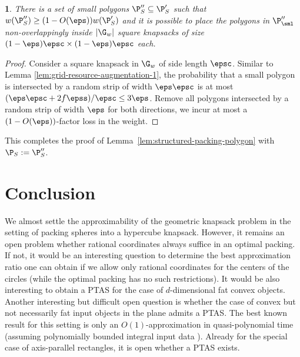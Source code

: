\documentclass[10pt,a4paper]{article}
\theoremstyle{plain}
\theoremstyle{plain}
\newtheorem{lem}[theorem]{\protect\lemmaname}
\theoremstyle{plain}
\theoremstyle{definition}
\providecommand{\lemmaname}{Lemma}
\newcommand{\agtwo}[1]{#1}
\begin{document}
{\begin{lem} \label{lem:grid-resource-augmentation}There is a set
	of small polygons $\P''_{S}\subseteq\P'_{S}$ such that $w(\P''_{S})\ge(1-O(\eps))w(\P'_{S})$
	and it is possible to place the polygons in $\P''_{\sml}$ non-overlappingly
	inside $|\G_{w}|$ square knapsacks of size $(1-\eps)\epsc \times(1-\eps)\epsc$
	each. \end{lem}
\begin{proof}
	Consider a square knapsack in $\G_{w}$ of side length $\epsc$.
        Similar to Lemma \ref{lem:grid-resource-augmentation-1}, the probability that a small polygon is intersected by a random strip of width $\eps \epsc$ is at most $(\eps\epsc+2f\epss)/\epsc \le 3\eps$.
	Remove all polygons intersected by a random strip of width $\eps$ for both directions, we incur at most a $(1-O(\eps))$-factor loss in the weight.
\end{proof}
This completes the proof of Lemma~\ref{lem:structured-packing-polygon} with $\P_{S}:= \P''_{S}$.



\section{Conclusion}
\label{sec:conc} 
We almost settle the approximability of the geometric knapsack problem in the setting of 
packing spheres into a hypercube knapsack. However, it remains an open problem whether rational coordinates always suffice in an optimal packing.
If not, it would be an interesting question to determine the 
best approximation ratio one can obtain if we allow only rational coordinates for the centers of the circles (while the optimal packing has no such restrictions).
It would be also interesting to obtain a \textsf{PTAS} for the case of $d$-dimensional fat convex objects.
Another interesting but difficult open question is whether the case of convex but not necessarily fat input objects in the plane admits a \textsf{PTAS}. The best \agtwo{known} result for this setting is only an $O(1)$-approximation in quasi-polynomial time (assuming polynomially bounded integral input data \cite{MerinoW20}).  Already for the special case of axis-parallel rectangles, it is open whether a \textsf{PTAS} exists. %

%


% 

}
\end{document}
